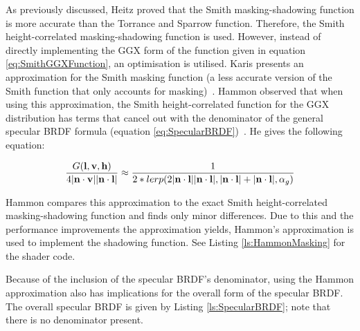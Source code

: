 
As previously discussed, Heitz proved that the Smith masking-shadowing function is more accurate than the Torrance and Sparrow function. Therefore, the Smith height-correlated masking-shadowing function is used. However, instead of directly implementing the GGX form of the function given in equation \ref{eq:SmithGGXFunction}, an optimisation is utilised. Karis presents an approximation for the Smith masking function (a less accurate version of the Smith function that only accounts for masking)~\cite{RealShadingInUnreal}. Hammon observed that when using this approximation, the Smith height-correlated function for the GGX distribution has terms that cancel out with the denominator of the general specular BRDF formula (equation \ref{eq:SpecularBRDF})~\cite{HammonBRDF}. He gives the following equation:

\begin{equation} \label{eq:HammonApproximation}
	\frac{G(\mathbf{l}, \mathbf{v}, \mathbf{h})}{4\abs{\mathbf{n}\cdot\mathbf{v}}\abs{\mathbf{n}\cdot\mathbf{l}}} \approx \frac{1}{2 * lerp(2\abs{\mathbf{n}\cdot\mathbf{l}}\abs{\mathbf{n}\cdot\mathbf{l}}, \abs{\mathbf{n}\cdot\mathbf{l}} + \abs{\mathbf{n}\cdot\mathbf{l}}, \alpha_g)}
\end{equation}

Hammon compares this approximation to the exact Smith height-correlated masking-shadowing function and finds only minor differences. Due to this and the performance improvements the approximation yields, Hammon's approximation is used to implement the shadowing function. See Listing \ref{ls:HammonMasking} for the shader code.

Because of the inclusion of the specular BRDF's denominator, using the Hammon approximation also has implications for the overall form of the specular BRDF. The overall specular BRDF is given by Listing \ref{ls:SpecularBRDF}; note that there is no denominator present.

